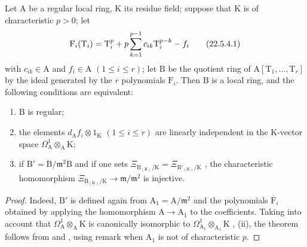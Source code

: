 \begin{theorem}[22.5.4]
\label{0.22.5.4}
Let $\mathrm{A}$ be a regular local ring, $\mathrm{K}$ its residue field; suppose that $\mathrm{K}$ is of characteristic $p>0$; let
\[
\label{0.22.5.4.1}
  \mathrm{F}_i(\mathrm{T}_i)=\mathrm{T}_i^p+p\sum_{k=1}^{p-1}c_{ik}\mathrm{T}_i^{p-k}- f_i
  \tag{22.5.4.1}
\]
with $c_{ik}\in\mathrm{A}$ and $f_i\in\mathrm{A}$ $(1\leq i\leq r)$; let $\mathrm{B}$ be the quotient ring of $\mathrm{A}[\mathrm{T}_1,\ldots,\mathrm{T}_r]$ by the ideal generated by the $r$ polynomials $\mathrm{F}_i$.
Then $\mathrm{B}$ is a local ring, and the following conditions are equivalent:
\begin{enumerate}
  \item[\textup{a)}] $\mathrm{B}$ is regular;
  \item[\textup{b)}] the elements $d_\mathrm{A}f_i\otimes 1_\mathrm{K}$ $(1\leq i\leq r)$ are linearly independent in the $\mathrm{K}$-vector space $\Omega^1_\mathrm{A}\otimes_\mathrm{A}\mathrm{K}$;
  \item[\textup{c)}] if $\mathrm{B}'=\mathrm{B}/\mathfrak{m}^2\mathrm{B}$ and if one sets $\Xi_{\mathrm{B}_{(\mathrm{K})}/\mathrm{K}}=\Xi_{\mathrm{B}'_{(\mathrm{K})}/\mathrm{K}}$ , the characteristic homomorphism $\Xi_{\mathrm{B}_{(\mathrm{K})}/\mathrm{K}}\to\mathfrak{m}/\mathfrak{m}^2$  is injective.
\end{enumerate}
\end{theorem}

\begin{proof}
Indeed, $\mathrm{B}'$ is defined again from $\mathrm{A}_1=\mathrm{A}/\mathfrak{m}^2$ and the polynomials $\overline{\mathrm{F}}_i$ obtained by applying the homomorphism $\mathrm{A}\to\mathrm{A}_1$ to the coefficients.
Taking into account that $\Omega^1_\mathrm{A}\otimes_\mathrm{A}\mathrm{K}$ is canonically isomorphic to $\Omega^1_{\mathrm{A}_1}\otimes_{\mathrm{A}_1}\mathrm{K}$ , (ii), the theorem follows from  and , using remark  when $\mathrm{A}_1$ is not of characteristic $p$.
\end{proof}

